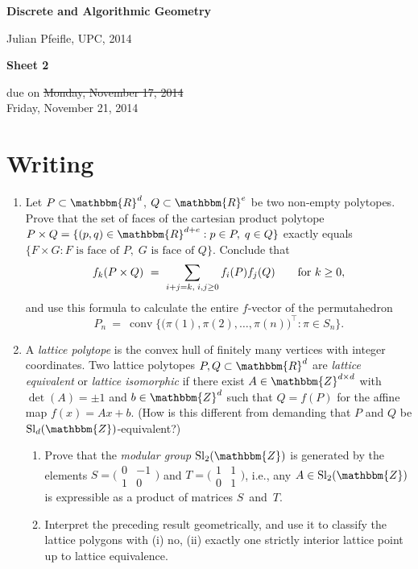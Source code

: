 \documentclass[11pt]{amsart}
\newcommand{\R}{\mathbbm{R}}
\newcommand{\Z}{\mathbbm{Z}}
\DeclareMathOperator{\conv}{conv}
\DeclareMathOperator{\Sl}{Sl}
\begin{document}
\begin{center}
\textbf{\sffamily
   Discrete and Algorithmic Geometry }

\medskip
   Julian Pfeifle,
   UPC, 2014 \mbox{}
\end{center}

\bigskip

\begin{center}
  \textbf{\sffamily Sheet 2}

\bigskip
 due on \sout{Monday, November 17, 2014} \\
 Friday, November 21, 2014

\end{center}

\bigskip
\bigskip
\bigskip

\section*{Writing}

\begin{enumerate}
\setlength{\itemsep}{2ex}
\item Let $P\subset\R^d$, $Q\subset\R^e$ be two non-empty polytopes. Prove that the set of faces of the cartesian product polytope $P\times Q=\{(p,q)\in\R^{d+e}:p\in P,\; q\in Q\}$ exactly equals $\{F\times G: F\text{ is face of }P, \;G\text{ is face of }Q\}$. Conclude that
\[
    f_k(P\times Q)
    \ = \
    \sum_{%
      i+j=k,\;i,j\ge0}f_i(P) f_j(Q)
    \qquad
    \text{for } k\ge0,
\]
and use this formula to calculate the entire $f$-vector of the permutahedron 
\[
  P_n 
  \ = \ 
  \conv\big\{\big(\pi(1),\pi(2),\dots,\pi(n)\big)^\top:\pi\in S_n\big\}.
\]

\item A \emph{lattice polytope} is the convex hull of finitely many
  vertices with integer coordinates. Two lattice polytopes
  $P,Q\subset\R^d$ are \emph{lattice equivalent} or \emph{lattice
    isomorphic} if there exist $A\in\Z^{d\times d}$ with
  $\det(A)=\pm1$ and $b\in\Z^d$ such that $Q=f(P)$ for the affine map
  $f(x)=Ax+b$. (How is this different from demanding that $P$ and $Q$
  be $\Sl_d(\Z)$-equivalent?)

  \begin{enumerate}
  \item Prove that the \emph{modular group} $\Sl_2(\Z)$ is generated by the elements $S=
    \big(\begin{smallmatrix}
      0 & -1 \\
      1 & 0
    \end{smallmatrix}\big)$ and $T=
    \big(\begin{smallmatrix}
      1 & 1 \\
      0 & 1
    \end{smallmatrix}\big)$, i.e., any $A\in\Sl_2(\Z)$ is expressible as a product of matrices $S$~and~$T$.

  \item Interpret the preceding result geometrically, and use it to
    classify the lattice polygons with (i) no, (ii) exactly one
    strictly interior lattice point up to lattice equivalence.
  \end{enumerate}
\end{enumerate}
\end{document}
